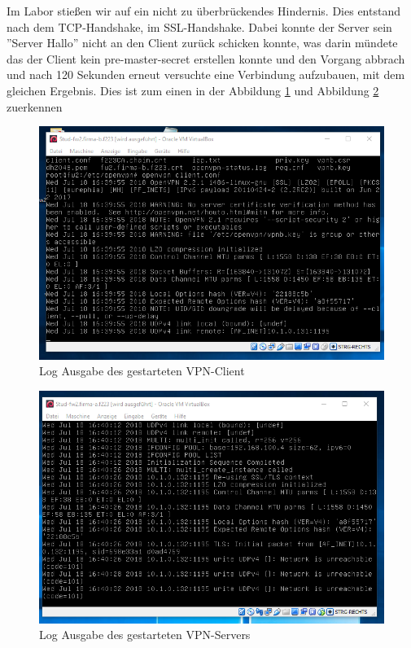 Im Labor stießen wir auf ein nicht zu überbrückendes Hindernis. Dies entstand nach dem TCP-Handshake, im SSL-Handshake. Dabei konnte der Server sein ''Server Hallo'' nicht an den Client zurück schicken konnte, was darin mündete das der Client kein pre-master-secret erstellen konnte und den Vorgang abbrach und nach 120 Sekunden erneut versuchte eine Verbindung aufzubauen, mit dem gleichen Ergebnis. Dies ist zum einen in der Abbildung \ref{fig:logClient}  und Abbildung \ref{fig:logServer} zuerkennen
\begin{figure}[h]
	\includegraphics[width=\textwidth]{pictures/clientlog.png}
	\caption{Log Ausgabe des gestarteten VPN-Client}
	\label{fig:logClient}
\end{figure}
\begin{figure}[h]
	\includegraphics[width=\textwidth]{pictures/Serverlog.png}
	\caption{Log Ausgabe des gestarteten VPN-Servers}
	\label{fig:logServer}
\end{figure}
